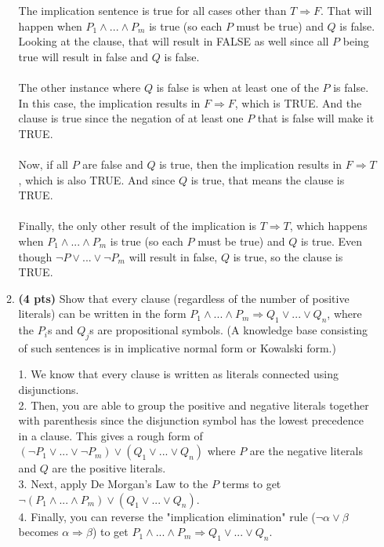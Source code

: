 \documentclass{article}
\begin{document}
\begin{enumerate}
\begin{enumerate}[label=($\alph*$)]
    \color{blue}
        The implication sentence is true for all cases other than $T \Rightarrow F$. That will happen when $P_1 \wedge ... \wedge P_m$ is true (so each $P$ must be true) and $Q$ is false. Looking at the clause, that will result in FALSE as well since all $P$ being true will result in false and $Q$ is false.\\\\
        The other instance where $Q$ is false is when at least one of the $P$ is false. In this case, the implication results in $F \Rightarrow F$, which is TRUE. And the clause is true since the negation of at least one $P$ that is false will make it TRUE.\\\\
        Now, if all $P$ are false and $Q$ is true, then the implication results in $F \Rightarrow T$, which is also TRUE. And since $Q$ is true, that means the clause is TRUE.\\\\
        Finally, the only other result of the implication is $T \Rightarrow T$, which happens when $P_1 \wedge ... \wedge P_m$ is true (so each $P$ must be true) and $Q$ is true. Even though $\neg P \vee ... \vee \neg P_m$ will result in false, $Q$ is true, so the clause is TRUE.
    \color{black}



    \item \textbf{(4 pts)} Show that every clause (regardless of the number of positive literals) can be written in the form $P_1 \wedge ... \wedge P_m \Rightarrow Q_1 \vee ... \vee Q_n$, where the $P_i$s and $Q_j$s are propositional symbols. (A knowledge base consisting of such sentences is in implicative normal form or Kowalski form.)

    \color{blue}
        1. We know that every clause is written as literals connected using disjunctions.\\
        2. Then, you are able to group the positive and negative literals together with parenthesis since the disjunction symbol has the lowest precedence in a clause. This gives a rough form of $(\neg P_1 \vee ... \vee \neg P_m) \vee (Q_1 \vee ... \vee Q_n)$ where $P$ are the negative literals and $Q$ are the positive literals.\\
        3. Next, apply De Morgan's Law to the $P$ terms to get $\neg ( P_1 \wedge ... \wedge P_m) \vee (Q_1 \vee ... \vee Q_n)$.\\
        4. Finally, you can reverse the "implication elimination" rule ($\neg \alpha \vee \beta$ becomes $\alpha \Rightarrow \beta$) to get $P_1 \wedge ... \wedge P_m \Rightarrow Q_1 \vee ... \vee Q_n$.
    \color{black}


\end{enumerate}
\end{enumerate}
\end{document}

